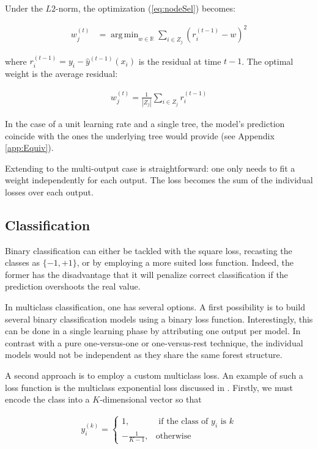 \documentclass{article}
\DeclareMathOperator*{\argmin}{arg\,min}
\begin{document}
Under the $L2$-norm, the optimization (\ref{eq:nodeSel}) becomes:

\begin{align}\label{eq:L2min}
w_j^{(t)} &=  \argmin_{w \in \mathbb{R}} \sum_{i \in Z_j} \left(r_i^{(t-1)} - 
w\right)^2
\end{align}

where $r_i^{(t-1)} = y_i - \hat{y}^{(t-1)}(x_i)$ is the residual at time $t-1$. 
The optimal weight is the average residual:

\begin{align}\label{eq:L2Solution}
w_j^{(t)} = \frac{1}{|Z_j|} \sum_{i \in Z_j} r_i^{(t-1)}
\end{align}

In the case of a unit learning rate and a single tree, the model's prediction 
coincide with the ones the underlying tree would provide (see Appendix 
\ref{app:Equiv}).

Extending to the multi-output case is straightforward: one only needs to fit a 
weight independently for each output. The loss becomes the sum of the 
individual losses over each output.

\subsection{Classification}
\label{subsec:classification}

Binary classification can either be tackled with the square loss, recasting the 
classes as $\{-1, +1\}$, or by employing a more suited loss function. Indeed, 
the former has the disadvantage that it will penalize correct classification if 
the prediction overshoots the real value.

In multiclass classification, one has several options. A first possibility is 
to build several binary classification models using a binary loss function. 
Interestingly, this can be done in a single learning phase by attributing one 
output per model. In contrast with a pure one-versus-one or one-versus-rest 
technique, the individual models would not be independent as they share the 
same forest structure.

A second approach is to employ a custom multiclass loss. An example of such a 
loss function is the multiclass exponential loss discussed in 
\citet{zhu2009multiadaboost}. Firstly, we must encode the class into a 
$K$-dimensional vector so that


\begin{align}\label{eq:MEencode}
y_i^{(k)} = \begin{cases}
1, &\text{ if the class of } y_i \text{ is } k \\
-\frac{1}{K-1}, &\text{otherwise}
\end{cases}
\end{align}
\end{document}
